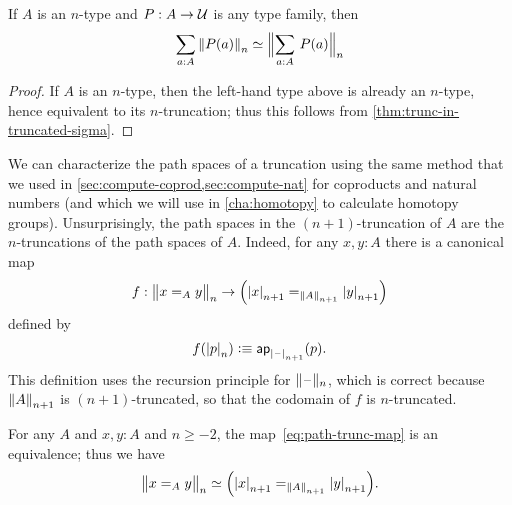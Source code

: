 \begin{cor}\label{thm:refl-over-ntype-base}
  If $A$ is an $n$-type and $P:A\to\type$ is any type family, then
  \[ \eqv{\sm{a:A} \trunc n{P(a)}}{\Trunc n{\sm{a:A}P(a)}} \]
\end{cor}
\begin{proof}
  If $A$ is an $n$-type, then the left-hand type above is already an $n$-type, hence equivalent to its $n$-truncation; thus this follows from \cref{thm:trunc-in-truncated-sigma}.
\end{proof}

We can characterize the path spaces of a truncation using the same method that we used in \cref{sec:compute-coprod,sec:compute-nat} for
coproducts and natural numbers (and which we will use in \cref{cha:homotopy} to calculate homotopy groups).
Unsurprisingly, the path spaces in the $(n+1)$-truncation of $A$ are the $n$-truncations of the path spaces of $A$.
Indeed, for any $x,y:A$ there is a canonical map
\begin{equation}
  f:\ttrunc n{x=_Ay}\to \Big(\tproj {n+1}x=_{\trunc{n+1}A}\tproj {n+1}y\Big)\label{eq:path-trunc-map}
\end{equation}
defined by
\[f(\tproj n{p})\defeq \apfunc{\tprojf {n+1}}(p). \]
This definition uses the recursion principle for $\truncf n$, which is correct because $\trunc {n+1}A$ is $(n+1)$-truncated, so that the
codomain of $f$ is $n$-truncated.

\begin{thm} \label{thm:path-truncation}
  For any $A$ and $x,y:A$ and $n\ge -2$, the map~\eqref{eq:path-trunc-map} is an equivalence; thus we have
  \[ \eqv{\ttrunc n{x=_Ay}}{\Big(\tproj {n+1}x=_{\trunc{n+1}A}\tproj {n+1}y\Big)}. \]
\end{thm}

